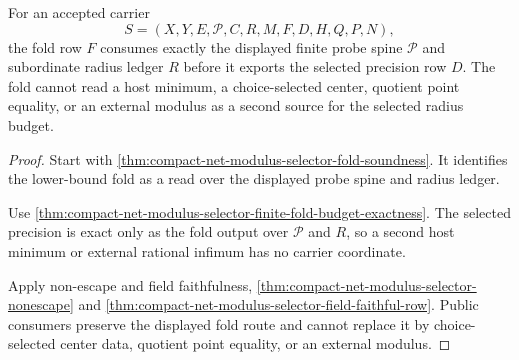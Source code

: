 \begin{theorem}
\label{thm:compact-net-modulus-selector-fold-radius-exhaustion}
For an accepted carrier
$$
S=(X,Y,E,\mathcal{P},C,R,M,F,D,H,Q,P,N),
$$
the fold row $F$ consumes exactly the displayed finite probe spine $\mathcal{P}$ and subordinate radius ledger $R$ before it exports the selected precision row $D$. The fold cannot read a host minimum, a choice-selected center, quotient point equality, or an external modulus as a second source for the selected radius budget.
\end{theorem}
\begin{proof}
Start with \autoref{thm:compact-net-modulus-selector-fold-soundness}. It identifies the lower-bound fold as a read over the displayed probe spine and radius ledger.

Use \autoref{thm:compact-net-modulus-selector-finite-fold-budget-exactness}. The selected precision is exact only as the fold output over $\mathcal{P}$ and $R$, so a second host minimum or external rational infimum has no carrier coordinate.

Apply non-escape and field faithfulness, \autoref{thm:compact-net-modulus-selector-nonescape} and \autoref{thm:compact-net-modulus-selector-field-faithful-row}. Public consumers preserve the displayed fold route and cannot replace it by choice-selected center data, quotient point equality, or an external modulus.
\end{proof}

